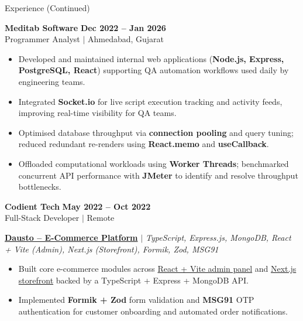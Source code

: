 \documentclass[10pt]{resume}
\begin{document}
\begin{rSection}{Experience (Continued)}

{\large\textbf{Meditab Software}} \hfill \textbf{Dec 2022 -- Jan 2026}\\[-0.1em]
{\small Programmer Analyst $|$ Ahmedabad, Gujarat}
\begin{itemize}[leftmargin=1.4em, itemsep=-0.38em, topsep=0.12em]
  \item Developed and maintained internal web applications (\textbf{Node.js, Express, PostgreSQL, React}) supporting QA automation workflows used daily by engineering teams.
  \item Integrated \textbf{Socket.io} for live script execution tracking and activity feeds, improving real-time visibility for QA teams.
  \item Optimised database throughput via \textbf{connection pooling} and query tuning; reduced redundant re-renders using \textbf{React.memo} and \textbf{useCallback}.
  \item Offloaded computational workloads using \textbf{Worker Threads}; benchmarked concurrent API performance with \textbf{JMeter} to identify and resolve throughput bottlenecks.
\end{itemize}

\vspace{0.08em}

{\large\textbf{Codient Tech}} \hfill \textbf{May 2022 -- Oct 2022}\\[-0.1em]
{\small Full-Stack Developer $|$ Remote}
\vspace{0.05em}

\textbf{\small\href{https://dausto.com}{Dausto -- E-Commerce Platform}}
{\small\textit{$|$ TypeScript, Express.js, MongoDB, React + Vite (Admin), Next.js (Storefront), Formik, Zod, MSG91}}
\begin{itemize}[leftmargin=1.4em, itemsep=-0.38em, topsep=0.04em]
  \item Built core e-commerce modules across \href{https://admin.dausto.com}{React + Vite admin panel} and \href{https://dausto.com}{Next.js storefront} backed by a TypeScript + Express + MongoDB API.
  \item Implemented \textbf{Formik + Zod} form validation and \textbf{MSG91} OTP authentication for customer onboarding and automated order notifications.
\end{itemize}

\end{rSection}
\vspace{-0.5em}
\end{document}
